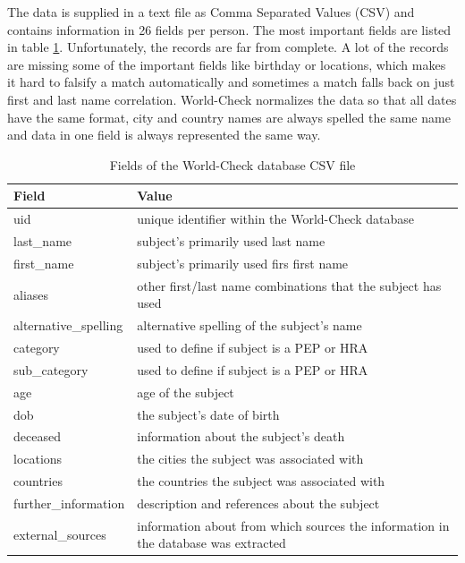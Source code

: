 \documentclass[a4paper, oneside]{csthesis}
\begin{document}
The data is supplied in a text file as Comma Separated Values (CSV) and contains information in 26 fields per person. The most important fields are listed in table \ref{tbl:world-check-fields}. Unfortunately, the records are far from complete. A lot of the records are missing some of the important fields like birthday or locations, which makes it hard to falsify a match automatically and sometimes a match falls back on just first and last name correlation. World-Check normalizes the data so that all dates have the same format, city and country names are always spelled the same name and data in one field is always represented the same way.

\begin{table}
    \begin{tabular}{l|p{9cm}}
    \hline
    Field & Value \\ \hline
    uid & unique identifier within the World-Check database\\ \hdashline[0.5pt/3pt]
    last\_name & subject's primarily used last name\\ \hdashline[0.5pt/3pt]
    first\_name & subject's primarily used firs first name \\ \hdashline[0.5pt/3pt]
    aliases & other first/last name combinations that the subject has used\\ \hdashline[0.5pt/3pt]
    alternative\_spelling & alternative spelling of the subject's name\\ \hdashline[0.5pt/3pt]
    category & used to define if subject is a PEP or HRA\\ \hdashline[0.5pt/3pt]
    sub\_category & used to define if subject is a PEP or HRA\\ \hdashline[0.5pt/3pt]
    age & age of the subject \\ \hdashline[0.5pt/3pt]
    dob & the subject's date of birth \\ \hdashline[0.5pt/3pt]
    deceased & information about the subject's death \\ \hdashline[0.5pt/3pt]
    locations & the cities the subject was associated with \\ \hdashline[0.5pt/3pt]
    countries & the countries the subject was associated with \\ \hdashline[0.5pt/3pt]
    further\_information & description and references about the subject \\ \hdashline[0.5pt/3pt]
    external\_sources & information about from which sources the information in the database was extracted \\ \hline

    \end{tabular}

    \caption{Fields of the World-Check database CSV file}
    \label{tbl:world-check-fields}
\end{table}
\end{document}

